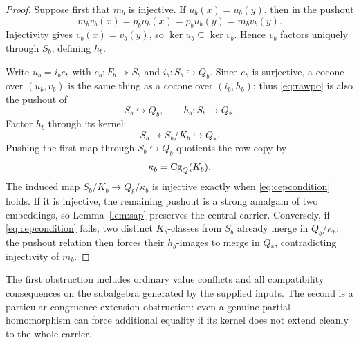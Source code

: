 \begin{proof}
Suppose first that $m_b$ is injective.  If $u_b(x)=u_b(y)$, then in the pushout
\[
m_bv_b(x)=p_bu_b(x)=p_bu_b(y)=m_bv_b(y).
\]
Injectivity gives $v_b(x)=v_b(y)$, so $\ker u_b\subseteq\ker v_b$.  Hence $v_b$ factors uniquely through $S_b$, defining $h_b$.

Write $u_b=i_be_b$ with $e_b:F_b\twoheadrightarrow S_b$ and $i_b:S_b\hookrightarrow Q_b$.  Since $e_b$ is surjective, a cocone over $(u_b,v_b)$ is the same thing as a cocone over $(i_b,h_b)$; thus \eqref{eq:rawpo} is also the pushout of
\[
S_b\hookrightarrow Q_b,
\qquad
h_b:S_b\to Q_*.
\]
Factor $h_b$ through its kernel:
\[
S_b\twoheadrightarrow S_b/K_b\hookrightarrow Q_*.
\]
Pushing the first map through $S_b\hookrightarrow Q_b$ quotients the row copy by
\[
\kappa_b=\operatorname{Cg}_Q(K_b).
\]
The induced map $S_b/K_b\to Q_b/\kappa_b$ is injective exactly when \eqref{eq:cepcondition} holds.  If it is injective, the remaining pushout is a strong amalgam of two embeddings, so Lemma~\ref{lem:sap} preserves the central carrier.  Conversely, if \eqref{eq:cepcondition} fails, two distinct $K_b$-classes from $S_b$ already merge in $Q_b/\kappa_b$; the pushout relation then forces their $h_b$-images to merge in $Q_*$, contradicting injectivity of $m_b$.
\end{proof}

The first obstruction includes ordinary value conflicts and all compatibility consequences on the subalgebra generated by the supplied inputs.  The second is a particular congruence-extension obstruction: even a genuine partial homomorphism can force additional equality if its kernel does not extend cleanly to the whole carrier.
